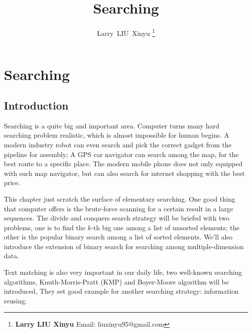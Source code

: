 \documentclass{article}
\begin{document}
\fi


\title{Searching}

\author{Larry~LIU~Xinyu
\thanks{{\bfseries Larry LIU Xinyu } \newline
  Email: liuxinyu95@gmail.com \newline}
  }


\maketitle

\ifx\wholebook\relax
\chapter{Searching}
\fi

\section{Introduction}
\label{introduction} 
Searching is a quite big and important area. Computer turns many hard
searching problem realistic, which is almost impossible for human begins.
A modern industry robot can even search and pick the correct gadget from
the pipeline for assembly; A GPS car navigator can search among the
map, for the best route to a specific place. The modern mobile phone
does not only equipped with such map navigator, but can also search
for internet shopping with the best price.

This chapter just scratch the surface of elementary searching. One
good thing that computer offers is the brute-force scanning for a
certain result in a large sequences. The divide and conquers
search strategy will be briefed with two problems, one is to find
the $k$-th big one among a list of unsorted elements; the other
is the popular binary search among a list of sorted elements.
We'll also introduce the extension of binary search for searching
among multiple-dimension data.

Text matching is also very important in our daily life, two well-known
searching algorithms, Knuth-Morris-Pratt (KMP) and Boyer-Moore algorithm
will be introduced, They set good example for another searching strategy:
information reusing.
\end{document}
